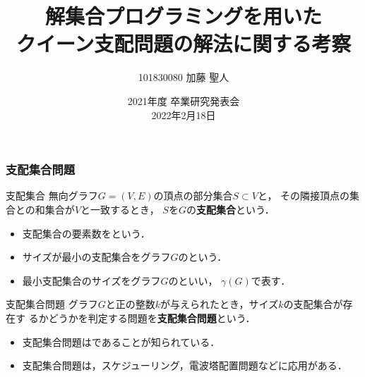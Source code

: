 \documentclass[dvipdfmx,10pt]{beamer}
\begin{document}
\title{解集合プログラミングを用いた\\クイーン支配問題の解法に関する考察}
\author{101830080 \quad 加藤 聖人}
\date{2021年度 卒業研究発表会 \\ 2022年2月18日}

%
%

\begin{frame}\frametitle{}
 \titlepage
\end{frame}

%
%

\begin{frame}\frametitle{支配集合問題}
 \begin{block}{支配集合}
無向グラフ$G=(V,E)$の頂点の部分集合$S\subset V$と，
その隣接頂点の集合との和集合が$V$と一致するとき，
$S$を$G$の\alert{\bf 支配集合}という．
\begin{itemize}
\item 支配集合の要素数をという．
\item サイズが最小の支配集合をグラフ$G$のという．
\item 最小支配集合のサイズをグラフ$G$のといい，
  $\gamma(G)$で表す．
\end{itemize}
\end{block}

\begin{block}{支配集合問題}
  グラフ$G$と正の整数$k$が与えられたとき，サイズ$k$の支配集合が存在す
  るかどうかを判定する問題を\alert{\bf 支配集合問題}という．
  \begin{itemize}
  \item 支配集合問題はであることが知られている．
  \item 支配集合問題は，スケジューリング，電波塔配置問題などに応用がある．
  \end{itemize}
 \end{block}
\end{frame}
\end{document}
